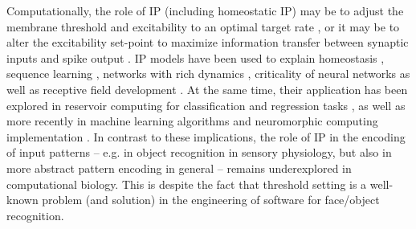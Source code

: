 Computationally, the role of IP (including homeostatic IP) may be to
        adjust the membrane threshold and excitability to an optimal target rate
            \citep{Lazar2007-fl, Naude2013-bt, Zheng2014-op, Li2018-ev, Del_Papa2019-du,Loidolt2020-pw,Wu2020-ru},
        or it may be to alter the excitability set-point to maximize information transfer between synaptic inputs and spike output
            \citep{Stemmler1999-iz, Triesch2005-jo, Triesch2007-np, Joshi2009-yy, Savin2010-bf, Li2013-qk,Li2016-ge, Zhang2019-eo, Zhang2019-qh, Shaw2020-hu}.
    IP models have been used to explain
        homeostasis \citep{LeMasson1993-fr,Marder2002-lv,Wu2020-ru},
        sequence learning \citep{Loidolt2020-pw},
        networks with rich dynamics \citep{Naude2013-bt, Zheng2014-op},
        criticality of neural networks \citep{Naude2013-bt,Del_Papa2019-du}
        as well as receptive field development \citep{Triesch2005-jo, Triesch2007-np,Savin2010-bf}.
    At the same time, their application has been explored in
        reservoir computing for classification and regression tasks \citep{Steil2007-ql,Wang2020-us},
        as well as more recently in machine learning algorithms \citep{Zhang2019-eo, Zhang2019-qh, Shaw2020-hu}
        and neuromorphic computing implementation \citep{Dalgaty2019-ng, Baek2020-si}.
    In contrast to these implications, the role of IP in the encoding of input patterns
        -- e.g. in object recognition in sensory physiology,
        but also in more abstract pattern encoding in general --
        remains underexplored in computational biology.
    This is despite the fact that threshold setting is a well-known problem (and solution)
        in the engineering of software for face/object recognition.

